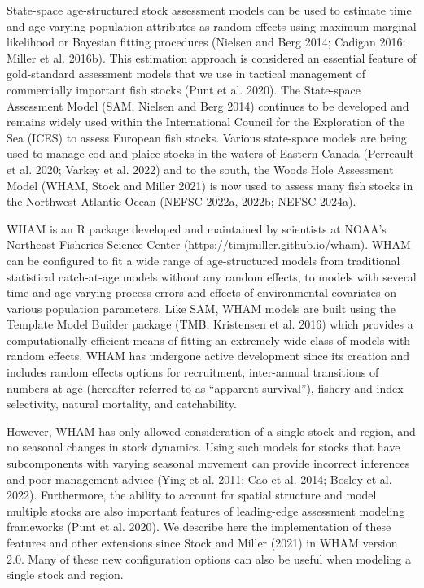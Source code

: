 \documentclass[
]{article}
\begin{document}
State-space age-structured stock assessment models can be used to estimate time and age-varying population attributes as random effects using maximum marginal likelihood or Bayesian fitting procedures (Nielsen and Berg 2014; Cadigan 2016; Miller et al. 2016b). This estimation approach is considered an essential feature of gold-standard assessment models that we use in tactical management of commercially important fish stocks (Punt et al. 2020). The State-space Assessment Model (SAM, Nielsen and Berg 2014) continues to be developed and remains widely used within the International Council for the Exploration of the Sea (ICES) to assess European fish stocks. Various state-space models are being used to manage cod and plaice stocks in the waters of Eastern Canada (Perreault et al. 2020; Varkey et al. 2022) and to the south, the Woods Hole Assessment Model (WHAM, Stock and Miller 2021) is now used to assess many fish stocks in the Northwest Atlantic Ocean (NEFSC 2022a, 2022b; NEFSC 2024a).

WHAM is an R package developed and maintained by scientists at NOAA's Northeast Fisheries Science Center (\url{https://timjmiller.github.io/wham}). WHAM can be configured to fit a wide range of age-structured models from traditional statistical catch-at-age models without any random effects, to models with several time and age varying process errors and effects of environmental covariates on various population parameters. Like SAM, WHAM models are built using the Template Model Builder package (TMB, Kristensen et al. 2016) which provides a computationally efficient means of fitting an extremely wide class of models with random effects. WHAM has undergone active development since its creation and includes random effects options for recruitment, inter-annual transitions of numbers at age (hereafter referred to as ``apparent survival''), fishery and index selectivity, natural mortality, and catchability.

However, WHAM has only allowed consideration of a single stock and region, and no seasonal changes in stock dynamics. Using such models for stocks that have subcomponents with varying seasonal movement can provide incorrect inferences and poor management advice (Ying et al. 2011; Cao et al. 2014; Bosley et al. 2022). Furthermore, the ability to account for spatial structure and model multiple stocks are also important features of leading-edge assessment modeling frameworks (Punt et al. 2020). We describe here the implementation of these features and other extensions since Stock and Miller (2021) in WHAM version 2.0. Many of these new configuration options can also be useful when modeling a single stock and region.
\end{document}
